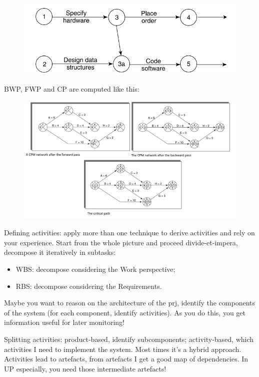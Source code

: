 \begin{figure} [H]
    \centering
    \includegraphics[width=0.5\linewidth]{Figures//03/cpmdummy2.png}
\end{figure}

\noindent BWP, FWP and CP are computed like this:
\begin{figure} [H]
    \centering
    \includegraphics[width=0.75\linewidth]{Figures//03/cpm_arrow_cp.png}
\end{figure}

\noindent Defining activities: apply more than one technique to derive activities and rely on your experience.
\noindent Start from the whole picture and proceed divide-et-impera, decompose it iteratively in subtasks:
\begin{itemize}
	\item WBS: decompose considering the Work perspective;
	\item RBS: decompose considering the Requirements.
\end{itemize}

\noindent Maybe you want to reason on the architecture of the prj, identify the components of the system (for each component, identify activities). As you do this, you get information useful for later monitoring!

\noindent Splitting activities: product-based, identify subcomponents; activity-based, which activities I need to implement the system. Most times it's a hybrid approach. Activities lead to artefacts, from artefacts I get a good map of dependencies. In UP especially, you need those intermediate artefacts!

